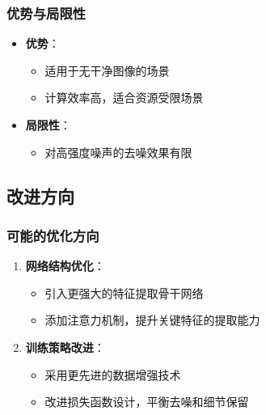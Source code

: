 \documentclass[UTF8]{ctexart}
\begin{document}
\subsubsection{优势与局限性}
\begin{itemize}
    \item \textbf{优势}：
    \begin{itemize}
        \item 适用于无干净图像的场景
        \item 计算效率高，适合资源受限场景
    \end{itemize}
    
    \item \textbf{局限性}：
    \begin{itemize}
        \item 对高强度噪声的去噪效果有限
    \end{itemize}
\end{itemize}

\subsection{改进方向}

\subsubsection{可能的优化方向}
\begin{enumerate}
    \item \textbf{网络结构优化}：
    \begin{itemize}
        \item 引入更强大的特征提取骨干网络
        \item 添加注意力机制，提升关键特征的提取能力
    \end{itemize}
    
    \item \textbf{训练策略改进}：
    \begin{itemize}
        \item 采用更先进的数据增强技术
        \item 改进损失函数设计，平衡去噪和细节保留
    \end{itemize}
\end{enumerate}
\end{document}
